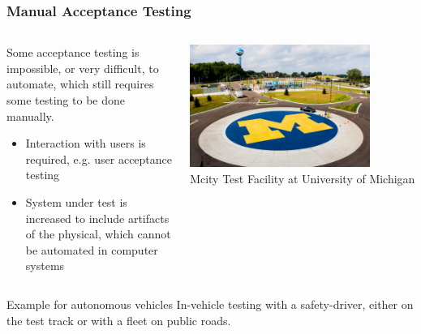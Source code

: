 \begin{frame}
\frametitle{Manual Acceptance Testing}
\begin{columns}[]
    \begin{column}{0.55\textwidth}
        Some acceptance testing is impossible, or very difficult, to automate,
        which still requires some testing to be done manually.\\
        \begin{itemize}
            \item Interaction with users is required, e.g. user acceptance testing
            \item System under test is increased to include artifacts of the
                physical, which cannot be automated in computer systems
        \end{itemize}
    \end{column}
    \begin{column}{0.45\textwidth}
        \centering
        \includegraphics[width=0.8\textwidth]{images/m-city.jpg}\\
        \footnotesize{Mcity Test Facility at University of Michigan\footnotemark[1]}
    \end{column}
\end{columns}
\begin{exampleblock}{Example for autonomous vehicles}
In-vehicle testing with a safety-driver, either on the test track or with a
fleet on public roads.
\end{exampleblock}
\end{frame}


